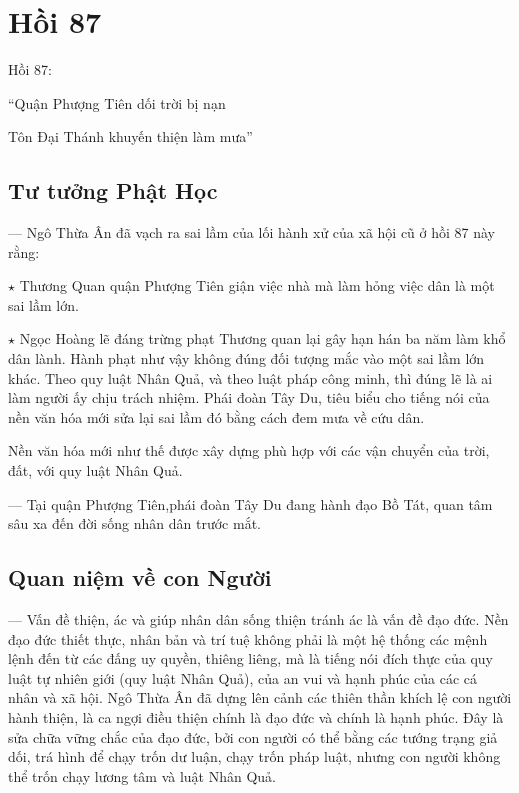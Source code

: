 \chapter{Hồi 87} %
\label{cha:hoi_87}

Hồi 87:

\begin{itshape}
``Quận Phượng Tiên dối trời bị nạn

Tôn Đại Thánh khuyến thiện làm mưa''
\end{itshape}

\section{Tư tưởng Phật Học} %
\label{sec:87_phat_hoc}

— Ngô Thừa Ân đã vạch ra sai lầm của lối hành xử của xã hội cũ ở hồi 87 này rằng:

$\star$ Thương Quan quận Phượng Tiên giận việc nhà mà làm hỏng việc dân là một sai lầm lớn.

$\star$ Ngọc Hoàng lẽ đáng trừng phạt Thương quan lại gây hạn hán ba năm làm khổ dân lành. Hành phạt như vậy không đúng đối tượng mắc vào một sai lầm lớn khác. Theo quy luật Nhân Quả, và theo luật pháp công minh, thì đúng lẽ là ai làm người ấy chịu trách nhiệm. Phái đoàn Tây Du, tiêu biểu cho tiếng nói của nền văn hóa mới sửa lại sai lầm đó bằng cách đem mưa về cứu dân.

Nền văn hóa mới như thế được xây dựng phù hợp với các vận chuyển của trời, đất, với quy luật Nhân Quả.

— Tại quận Phượng Tiên,phái đoàn Tây Du đang hành đạo Bồ Tát, quan tâm sâu xa đến đời sống nhân dân trước mắt.

\section{Quan niệm về con Người} %
\label{sec:87_con_nguoi}

— Vấn đề thiện, ác và giúp nhân dân sống thiện tránh ác là vấn đề đạo đức. Nền đạo đức thiết thực, nhân bản và trí tuệ không phải là một hệ thống các mệnh lệnh đến từ các đấng uy quyền, thiêng liêng, mà là tiếng nói đích thực của quy luật tự nhiên giới (quy luật Nhân Quả), của an vui và hạnh phúc của các cá nhân và xã hội. Ngô Thừa Ân đã dựng lên cảnh các thiên thần khích lệ con người hành thiện, là ca ngợi điều thiện chính là đạo đức và chính là hạnh phúc. Đây là sửa chữa vững chắc của đạo đức, bởi con người có thể bằng các tướng trạng giả dối, trá hình để chạy trốn dư luận, chạy trốn pháp luật, nhưng con người không thể trốn chạy lương tâm và luật Nhân Quả.

